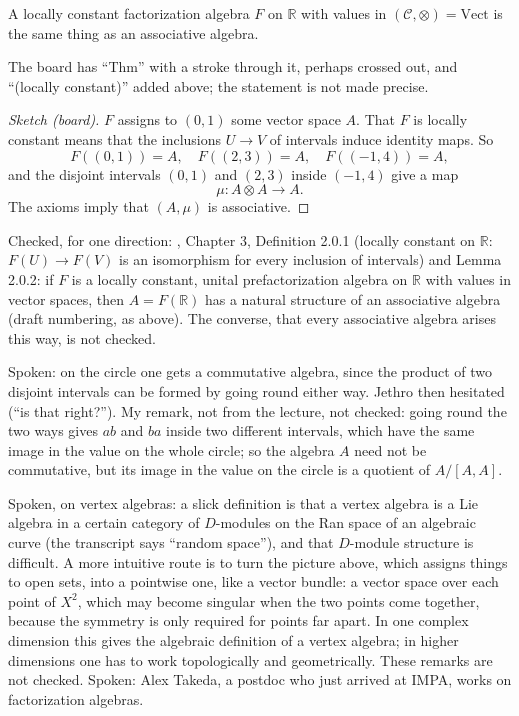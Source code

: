 \begin{theorem}
\label{theorem-factorization-algebras-on-r}
A locally constant factorization algebra
$F$ on $\mathbb{R}$ with values in
$(\mathcal{C},\otimes)=\mathrm{Vect}$ is the
same thing as an associative algebra.
\end{theorem}

\noindent
The board has ``Thm'' with a stroke through
it, perhaps crossed out, and ``(locally
constant)'' added above; the statement is
not made precise.

\begin{proof}[Sketch (board)]
$F$ assigns to $(0,1)$ some vector space
$A$. That $F$ is locally constant means
that the inclusions $U\to V$ of intervals
induce identity maps. So
$$
F((0,1))=A,\quad F((2,3))=A,\quad
F((-1,4))=A,
$$
and the disjoint intervals $(0,1)$ and
$(2,3)$ inside $(-1,4)$ give a map
$$
\mu\colon A\otimes A\to A.
$$
The axioms imply that $(A,\mu)$ is
associative.
\end{proof}

\noindent
Checked, for one direction:
\cite{CostelloGwilliam2017}, Chapter 3,
Definition 2.0.1 (locally constant on
$\mathbb{R}$: $F(U)\to F(V)$ is an
isomorphism for every inclusion of
intervals) and Lemma 2.0.2: if $F$ is a
locally constant, unital prefactorization
algebra on $\mathbb{R}$ with values in
vector spaces, then $A=F(\mathbb{R})$ has a
natural structure of an associative algebra
(draft numbering, as above). The converse,
that every associative algebra arises this
way, is not checked.

Spoken: on the circle one gets a
commutative algebra, since the product of
two disjoint intervals can be formed by
going round either way. Jethro then
hesitated (``is that right?''). My remark,
not from the lecture, not checked: going
round the two ways gives $ab$ and $ba$ inside
two different intervals, which have the same
image in the value on the whole circle; so
the algebra $A$ need not be commutative, but
its image in the value on the circle is a
quotient of $A/[A,A]$.

Spoken, on vertex algebras: a slick
definition is that a vertex algebra is a Lie
algebra in a certain category of
$D$-modules on the Ran space of an algebraic
curve (the transcript says ``random
space''), and that $D$-module structure is
difficult. A more intuitive route is to turn
the picture above, which assigns things to
open sets, into a pointwise one, like a
vector bundle: a vector space over each
point of $X^2$, which may become singular
when the two points come together, because
the symmetry is only required for points
far apart. In one complex dimension this
gives the algebraic definition of a vertex
algebra; in higher dimensions one has to
work topologically and geometrically. These
remarks are not checked. Spoken: Alex
Takeda, a postdoc who just arrived at IMPA,
works on factorization algebras.

